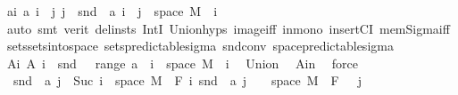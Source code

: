 \begin{isabellebody}
\ a{\isacharunderscore}{\kern0pt}i{\isacharcolon}{\kern0pt}\ {\isachardoublequoteopen}a\ i\ {\isacharequal}{\kern0pt}\ {\isacharparenleft}{\kern0pt}{\isasymUnion}j{\isachardot}{\kern0pt}\ {\isacharbraceleft}{\kern0pt}j{\isacharbraceright}{\kern0pt}\ {\isasymtimes}\ {\isacharparenleft}{\kern0pt}snd\ {\isacharbackquote}{\kern0pt}\ {\isacharparenleft}{\kern0pt}a\ i\ {\isasyminter}\ {\isacharparenleft}{\kern0pt}{\isacharbraceleft}{\kern0pt}j{\isacharbraceright}{\kern0pt}\ {\isasymtimes}\ space\ M{\isacharparenright}{\kern0pt}{\isacharparenright}{\kern0pt}{\isacharparenright}{\kern0pt}{\isacharparenright}{\kern0pt}{\isachardoublequoteclose}\ \ i\ \isamarkupfalse%
\ auto\ {\isacharparenleft}{\kern0pt}smt\ {\isacharparenleft}{\kern0pt}verit{\isacharcomma}{\kern0pt}\ del{\isacharunderscore}{\kern0pt}insts{\isacharparenright}{\kern0pt}\ IntI\ Union{\isachardot}{\kern0pt}hyps{\isacharparenleft}{\kern0pt}{}{\isacharparenright}{\kern0pt}\ image{\isacharunderscore}{\kern0pt}iff\ in{\isacharunderscore}{\kern0pt}mono\ insertCI\ mem{\isacharunderscore}{\kern0pt}Sigma{\isacharunderscore}{\kern0pt}iff\ sets{\isachardot}{\kern0pt}sets{\isacharunderscore}{\kern0pt}into{\isacharunderscore}{\kern0pt}space\ sets{\isacharunderscore}{\kern0pt}predictable{\isacharunderscore}{\kern0pt}sigma\ snd{\isacharunderscore}{\kern0pt}conv\ space{\isacharunderscore}{\kern0pt}predictable{\isacharunderscore}{\kern0pt}sigma{\isacharparenright}{\kern0pt}\isanewline
\ \ \isamarkupfalse%
\ A{\isacharunderscore}{\kern0pt}i{\isacharcolon}{\kern0pt}\ {\isachardoublequoteopen}A\ i\ {\isacharequal}{\kern0pt}\ snd\ {\isacharbackquote}{\kern0pt}\ {\isacharparenleft}{\kern0pt}{\isasymUnion}\ {\isacharparenleft}{\kern0pt}range\ a{\isacharparenright}{\kern0pt}\ {\isasyminter}\ {\isacharparenleft}{\kern0pt}{\isacharbraceleft}{\kern0pt}i{\isacharbraceright}{\kern0pt}\ {\isasymtimes}\ space\ M{\isacharparenright}{\kern0pt}{\isacharparenright}{\kern0pt}{\isachardoublequoteclose}\ \ i\ \isamarkupfalse%
\ Union{\isacharparenleft}{\kern0pt}{}{\isacharparenright}{\kern0pt}\ \isamarkupfalse%
\ A{\isacharunderscore}{\kern0pt}in\ \isamarkupfalse%
\ force\ \isanewline
\ \ \isamarkupfalse%
\ {\isacharasterisk}{\kern0pt}{\isacharcolon}{\kern0pt}\ {\isachardoublequoteopen}snd\ {\isacharbackquote}{\kern0pt}\ {\isacharparenleft}{\kern0pt}a\ j\ {\isasyminter}\ {\isacharparenleft}{\kern0pt}{\isacharbraceleft}{\kern0pt}Suc\ i{\isacharbraceright}{\kern0pt}\ {\isasymtimes}\ space\ M{\isacharparenright}{\kern0pt}{\isacharparenright}{\kern0pt}\ {\isasymin}\ F\ i{\isachardoublequoteclose}\ {\isachardoublequoteopen}snd\ {\isacharbackquote}{\kern0pt}\ {\isacharparenleft}{\kern0pt}a\ j\ {\isasyminter}\ {\isacharparenleft}{\kern0pt}{\isacharbraceleft}{\kern0pt}{}{\isacharbraceright}{\kern0pt}\ {\isasymtimes}\ space\ M{\isacharparenright}{\kern0pt}{\isacharparenright}{\kern0pt}\ {\isasymin}\ F\ {}{\isachardoublequoteclose}\ \ j\ \isamarkupfalse%

\end{isabellebody}
